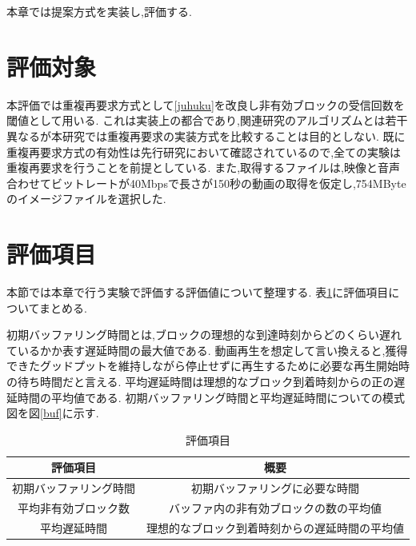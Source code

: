 \documentclass[a4j,12pt]{gradthesis_utf8}
\begin{document}
本章では提案方式を実装し,評価する.

\section{評価対象}
本評価では重複再要求方式として\ref{juhuku}を改良し非有効ブロックの受信回数を閾値として用いる.
これは実装上の都合であり,関連研究のアルゴリズムとは若干異なるが本研究では重複再要求の実装方式を比較することは目的としない.
既に重複再要求方式の有効性は先行研究において確認されているので,全ての実験は重複再要求を行うことを前提としている.
また,取得するファイルは,映像と音声合わせてビットレートが40Mbpsで長さが150秒の動画の取得を仮定し,754MByteのイメージファイルを選択した.

\section{評価項目}
\label{hyoukakoumoku}
本節では本章で行う実験で評価する評価値について整理する.
表\ref{hyoka}に評価項目についてまとめる.

初期バッファリング時間とは,ブロックの理想的な到達時刻からどのくらい遅れているかか表す遅延時間の最大値である.
動画再生を想定して言い換えると,獲得できたグッドプットを維持しながら停止せずに再生するために必要な再生開始時の待ち時間だと言える.
平均遅延時間は理想的なブロック到着時刻からの正の遅延時間の平均値である.
初期バッファリング時間と平均遅延時間についての模式図を図\ref{buf}に示す.

\newpage

\begin{table}[htb]
	\begin{center}
		\caption{評価項目}
		\label{hyoka}
		\begin{tabular}{|c|c|} \hline
			評価項目 & 概要　\\ \hline \hline
			初期バッファリング時間 & 初期バッファリングに必要な時間 \\ \hline
			平均非有効ブロック数 & バッファ内の非有効ブロックの数の平均値 \\ \hline
			平均遅延時間 & 理想的なブロック到着時刻からの遅延時間の平均値 \\ \hline
		\end{tabular}
	\end{center}
\end{table}
\end{document}
